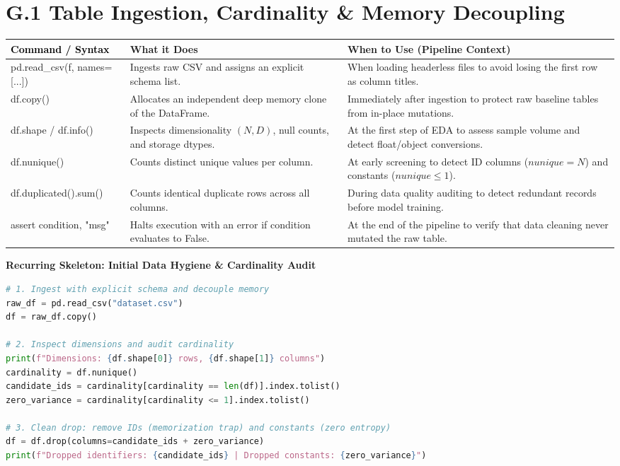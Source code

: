 \documentclass[11pt,a4paper]{article}
\begin{document}
\section*{G.1 Table Ingestion, Cardinality \& Memory Decoupling}

{\small
\noindent
\begin{tabularx}{\textwidth}{|>{\raggedright\arraybackslash\ttfamily\footnotesize\color{codebase}}p{5.8cm}|>{\raggedright\arraybackslash}X|>{\raggedright\arraybackslash}X|}
\hline
\textbf{\textcolor{black}{\textrm{Command / Syntax}}} & \textbf{What it Does} & \textbf{When to Use (Pipeline Context)} \\ \hline
pd.read\_csv(f, names=[...]) & Ingests raw CSV and assigns an explicit schema list. & When loading headerless files to avoid losing the first row as column titles. \\ \hline
df.copy() & Allocates an independent deep memory clone of the DataFrame. & Immediately after ingestion to protect raw baseline tables from in-place mutations. \\ \hline
df.shape / df.info() & Inspects dimensionality $(N, D)$, null counts, and storage dtypes. & At the first step of EDA to assess sample volume and detect float/object conversions. \\ \hline
df.nunique() & Counts distinct unique values per column. & At early screening to detect ID columns ($nunique=N$) and constants ($nunique \le 1$). \\ \hline
df.duplicated().sum() & Counts identical duplicate rows across all columns. & During data quality auditing to detect redundant records before model training. \\ \hline
assert condition, "msg" & Halts execution with an error if condition evaluates to False. & At the end of the pipeline to verify that data cleaning never mutated the raw table. \\ \hline
\end{tabularx}
}

\vspace{0.5em}
\noindent\textbf{Recurring Skeleton: Initial Data Hygiene \& Cardinality Audit}\par\vspace{0.2em}\nopagebreak
\begin{lstlisting}[language=Python]
# 1. Ingest with explicit schema and decouple memory
raw_df = pd.read_csv("dataset.csv")
df = raw_df.copy()

# 2. Inspect dimensions and audit cardinality
print(f"Dimensions: {df.shape[0]} rows, {df.shape[1]} columns")
cardinality = df.nunique()
candidate_ids = cardinality[cardinality == len(df)].index.tolist()
zero_variance = cardinality[cardinality <= 1].index.tolist()

# 3. Clean drop: remove IDs (memorization trap) and constants (zero entropy)
df = df.drop(columns=candidate_ids + zero_variance)
print(f"Dropped identifiers: {candidate_ids} | Dropped constants: {zero_variance}")
\end{lstlisting}
\end{document}
